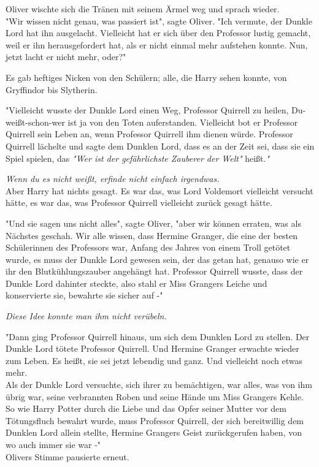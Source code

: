 {Oliver wischte sich die Tränen mit seinem Ärmel weg und sprach wieder.\\ "Wir wissen nicht genau, was passiert ist", sagte Oliver. "Ich vermute, der Dunkle Lord hat ihn ausgelacht. Vielleicht hat er sich über den Professor lustig gemacht, weil er ihn herausgefordert hat, als er nicht einmal mehr aufstehen konnte. Nun, jetzt lacht er nicht mehr, oder?"

Es gab heftiges Nicken von den Schülern; alle, die Harry sehen konnte, von Gryffindor bis Slytherin.

"Vielleicht wusste der Dunkle Lord einen Weg, Professor Quirrell zu heilen, Du-weißt-schon-wer ist ja von den Toten auferstanden. Vielleicht bot er Professor Quirrell sein Leben an, wenn Professor Quirrell ihm dienen würde. Professor Quirrell lächelte und sagte dem Dunklen Lord, dass es an der Zeit sei, dass sie ein Spiel spielen, das \emph{"Wer ist der gefährlichste Zauberer der Welt"} heißt.\emph{"}

\emph{Wenn du es nicht weißt, erfinde nicht einfach irgendwas.}\\ Aber Harry hat nichts gesagt. Es war das, was Lord Voldemort vielleicht versucht hätte, es war das, was Professor Quirrell vielleicht zurück gesagt hätte.

"Und sie sagen uns nicht alles", sagte Oliver, "aber wir können erraten, was als Nächstes geschah. Wir alle wissen, dass Hermine Granger, die eine der besten Schülerinnen des Professors war, Anfang des Jahres von einem Troll getötet wurde, es muss der Dunkle Lord gewesen sein, der das getan hat, genauso wie er ihr den Blutkühlungszauber angehängt hat. Professor Quirrell wusste, dass der Dunkle Lord dahinter steckte, also stahl er Miss Grangers Leiche und konservierte sie, bewahrte sie sicher auf -"

\emph{Diese Idee konnte man ihm nicht verübeln.}

"Dann ging Professor Quirrell hinaus, um sich dem Dunklen Lord zu stellen. Der Dunkle Lord tötete Professor Quirrell. Und Hermine Granger erwachte wieder zum Leben. Es heißt, sie sei jetzt lebendig und ganz. Und vielleicht noch etwas mehr.\\ Als der Dunkle Lord versuchte, sich ihrer zu bemächtigen, war alles, was von ihm übrig war, seine verbrannten Roben und seine Hände um Miss Grangers Kehle.\\ So wie Harry Potter durch die Liebe und das Opfer seiner Mutter vor dem Tötungsfluch bewahrt wurde, muss Professor Quirrell, der sich bereitwillig dem Dunklen Lord allein stellte, Hermine Grangers Geist zurückgerufen haben, von wo auch immer sie war -"\\ Olivers Stimme pausierte erneut.

}
